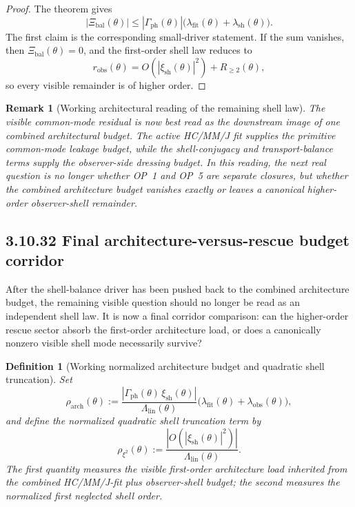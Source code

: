 \documentclass[12pt,a4paper]{article}
\newtheorem{definition}[theorem]{Definition}
\newtheorem{remark}[theorem]{Remark}
\begin{document}
\begin{proof}
The theorem gives
\[
 |\Xi_{\mathrm{bal}}(\theta)|
 \le
 |\Gamma_{\mathrm{ph}}(\theta)|\bigl(\lambda_{\mathrm{fit}}(\theta)+\lambda_{\mathrm{sh}}(\theta)\bigr).
\]
The first claim is the corresponding small-driver statement. If the sum vanishes, then \(\Xi_{\mathrm{bal}}(\theta)=0\), and the first-order shell law reduces to
\[
 r_{\mathrm{obs}}(\theta)=O\!\left(|\xi_{\mathrm{sh}}(\theta)|^2\right)+R_{\ge 2}(\theta),
\]
so every visible remainder is of higher order.
\end{proof}

\begin{remark}[Working architectural reading of the remaining shell law]
The visible common-mode residual is now best read as the downstream image of one combined architectural budget. The active HC/MM/J fit supplies the primitive common-mode leakage budget, while the shell-conjugacy and transport-balance terms supply the observer-side dressing budget. In this reading, the next real question is no longer whether OP~1 and OP~5 are separate closures, but whether the combined architecture budget vanishes exactly or leaves a canonical higher-order observer-shell remainder.
\end{remark}


\subsection*{3.10.32 Final architecture-versus-rescue budget corridor}
After the shell-balance driver has been pushed back to the combined architecture budget, the remaining visible question should no longer be read as an independent shell law. It is now a final corridor comparison: can the higher-order rescue sector absorb the first-order architecture load, or does a canonically nonzero visible shell mode necessarily survive?

\begin{definition}[Working normalized architecture budget and quadratic shell truncation]
Set
\[
 \rho_{\mathrm{arch}}(\theta)
 :=
 \frac{|\Gamma_{\mathrm{ph}}(\theta)\,\xi_{\mathrm{sh}}(\theta)|}{\Lambda_{\mathrm{lin}}(\theta)}
 \bigl(\lambda_{\mathrm{fit}}(\theta)+\lambda_{\mathrm{obs}}(\theta)\bigr),
\]
and define the normalized quadratic shell truncation term by
\[
 \rho_{\xi^2}(\theta)
 :=
 \frac{|O(|\xi_{\mathrm{sh}}(\theta)|^2)|}{\Lambda_{\mathrm{lin}}(\theta)}.
\]
The first quantity measures the visible first-order architecture load inherited from the combined HC/MM/J-fit plus observer-shell budget; the second measures the normalized first neglected shell order.
\end{definition}
\end{document}
